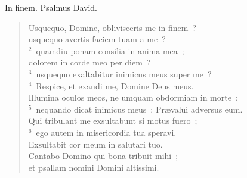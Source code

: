 \bchapter
\lettrine[lines=3,image=true,loversize=0.05,lraise=-0.03]{I}{}n finem. Psalmus David. \begin{flushleft}\begin{verse}\vspace{6pt}Usquequo, Domine, oblivisceris me in finem~?\\ usquequo avertis faciem tuam a me~?\\
${}^{2}$~quamdiu ponam consilia in anima mea~;\\ dolorem in corde meo per diem~?\\
${}^{3}$~usquequo exaltabitur inimicus meus super me~?\\
${}^{4}$~Respice, et exaudi me, Domine Deus meus.\\ Illumina oculos meos, ne umquam obdormiam in morte~;\\
${}^{5}$~nequando dicat inimicus meus~: Pr\ae valui adversus eum.\\ Qui tribulant me exsultabunt si motus fuero~;\\
${}^{6}$~ego autem in misericordia tua speravi.\\ Exsultabit cor meum in salutari tuo.\\ Cantabo Domino qui bona tribuit mihi~;\\ et psallam nomini Domini altissimi.\end{verse}\end{flushleft}




